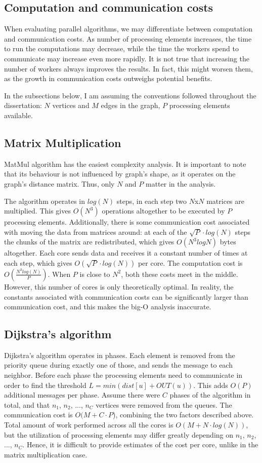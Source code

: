 \documentclass[12pt,a4paper,twoside,openright]{report}
\begin{document}
\subsection{Computation and communication costs}
When evaluating parallel algorithms, we may differentiate between computation and communication costs. As number of processing elements increases, the time to run the computations may decrease, while the time the workers spend to communicate may increase even more rapidly. It is not true that increasing the number of workers always improves the results. In fact, this might worsen them, as the growth in communication costs outweighs potential benefits.

In the subsections below, I am assuming the conventions followed throughout the dissertation: $N$ vertices and $M$ edges in the graph, $P$ processing elements available. 

\subsection{Matrix Multiplication}
MatMul algorithm has the easiest complexity analysis. It is important to note that its behaviour is not influenced by graph's shape, as it operates on the graph's distance matrix. Thus, only $N$ and $P$ matter in the analysis.

The algorithm operates in $log(N)$ steps, in each step two $N$x$N$ matrices are multiplied. This gives $O(N^3)$ operations altogether to be executed by $P$ processing elements. Additionally, there is some communication cost associated with moving the data from matrices around: at each of the $\sqrt{P} \cdot log(N)$ steps the chunks of the matrix are redistributed, which gives $O(N^3 log N)$ bytes altogether. Each core sends data and receives it a constant number of times at each step, which gives $O(\sqrt{P}\cdot log(N))$ per core. The computation cost is $O(\frac{N^3 log(N)}{P})$. When $P$ is close to $N^2$, both these costs meet in the middle. However, this number of cores is only theoretically optimal. In reality, the constants associated with communication costs can be significantly larger than communication cost, and this makes the big-O analysis inaccurate.

\subsection{Dijkstra's algorithm}
Dijkstra's algorithm operates in phases. Each element is removed from the priority queue during exactly one of those, and sends the message to each neighbor. Before each phase the processing elements need to communicate in order to find the threshold $L = min(dist[u] + OUT(u))$. This adds $O(P)$ additional messages per phase. Assume there were $C$ phases of the algorithm in total, and that $n_1$, $n_2$, ..., $n_C$ vertices were removed from the queues. The communication cost is $O(M + C\cdot P$), combining the two factors described above. Total amount of work performed across all the cores is $O(M + N\cdot log(N))$, but the utilization of processing elements may differ greatly depending on $n_1$, $n_2$, ..., $n_C$. Hence, it is difficult to provide estimates of the cost per core, unlike in the matrix multiplication case. 
\end{document}
